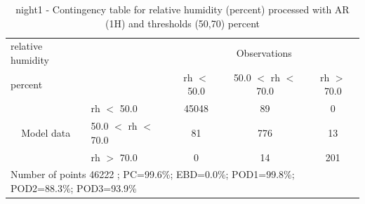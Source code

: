 \begin{table}[p!]
\begin{center}
\begin{tabular}{llccc}
\hline
{relative humidity}                                       &                                                    & \multicolumn{3}{c}{Observations}                 \\
{percent}                                       &                             & rh $<$ 50.0   & 50.0 $<$ rh $<$ 70.0 & rh $>$ 70.0 \\
\hline
\multicolumn{1}{c}{\multirow{3}{*}{Model data}}  & rh $<$ 50.0             & 45048                & 89                       & 0              \\
                                                 & 50.0  $<$ rh $<$ 70.0 & 81                & 776                       & 13              \\
                                                 & rh $>$ 70.0             & 0                & 14                       & 201              \\
\hline
\multicolumn{5}{l}{ Number of points        46222 ; PC=99.6\%; EBD=0.0\%; POD1=99.8\%; POD2=88.3\%; POD3=93.9\%}
\end{tabular}
\end{center}
\caption{night1 - Contingency table for  relative humidity (percent) processed with AR (1H) and thresholds (50,70) percent}
\label{tab:contingencyrhAFT:night1}
\end{table}
